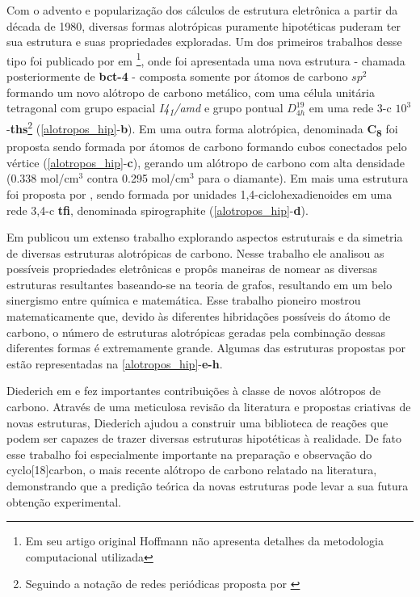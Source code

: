 		Com o advento e popularização dos cálculos de estrutura eletrônica a partir da década de 1980, diversas formas alotrópicas puramente hipotéticas puderam ter sua estrutura e suas propriedades exploradas. Um dos primeiros trabalhos desse tipo foi publicado por \citeauthor{hoffmann1983hypothetical} em \citeyear{hoffmann1983hypothetical}\footnote{Em seu artigo original Hoffmann não apresenta detalhes da metodologia computacional utilizada}, onde foi apresentada uma nova estrutura - chamada posteriormente de \textbf{bct-4} - composta somente por átomos de carbono $sp^2$ formando um novo alótropo de carbono metálico, com uma célula unitária tetragonal com grupo espacial \textit{I4\textsubscript{1}/amd} e grupo pontual $D^{19}_{4h}$ em uma rede 3-c $10^3$-\textbf{ths}\footnote{Seguindo a notação de redes periódicas proposta por \citeauthor{o2008reticular}} (\autoref{alotropos_hip}-\textbf{b}). Em \citeyear{johnston1989superdense} uma outra forma alotrópica, denominada \textbf{C\textsubscript{8}} foi proposta sendo formada por átomos de carbono formando cubos conectados pelo vértice (\autoref{alotropos_hip}-\textbf{c}), gerando um alótropo de carbono com alta densidade (0.338 mol/cm$^3$ contra 0.295 mol/cm$^3$ para o diamante). Em \citeyear{bucknum1994hypothetical} mais uma estrutura foi proposta por \citeauthor{bucknum1994hypothetical}, sendo formada por unidades 1,4-ciclohexadienoides em uma rede 3,4-c \textbf{tfi}, denominada spirographite (\autoref{alotropos_hip}-\textbf{d}). 
	
		Em \citeyear{balaban1989carbon} \citeauthor{balaban1989carbon} publicou um extenso trabalho explorando aspectos estruturais e da simetria de diversas estruturas alotrópicas de carbono. Nesse trabalho ele analisou as possíveis propriedades eletrônicas e propôs maneiras de nomear as diversas estruturas resultantes baseando-se na teoria de grafos, resultando em um belo sinergismo entre química e matemática. Esse trabalho pioneiro mostrou matematicamente que, devido às diferentes hibridações possíveis do átomo de carbono, o número de estruturas alotrópicas geradas pela combinação dessas diferentes formas é extremamente grande. Algumas das estruturas propostas por \citeauthor{balaban1989carbon} estão representadas na \autoref{alotropos_hip}-\textbf{e-h}.
		
		Diederich em \citeyear{diederich1992synthetic} \cite{diederich1992synthetic} e \citeyear{diederich1994carbon} \cite{diederich1994carbon, diederich1994synthetic} fez importantes contribuições à classe de novos alótropos de carbono. Através de uma meticulosa revisão da literatura e propostas criativas de novas estruturas, Diederich ajudou a construir uma biblioteca de reações que podem ser capazes de trazer diversas estruturas hipotéticas à realidade. De fato esse trabalho foi especialmente importante na preparação e observação do cyclo[18]carbon\cite{kaiser2019sp}, o mais recente alótropo de carbono relatado na literatura, demonstrando que a predição teórica da novas estruturas pode levar a sua futura obtenção experimental.
		
